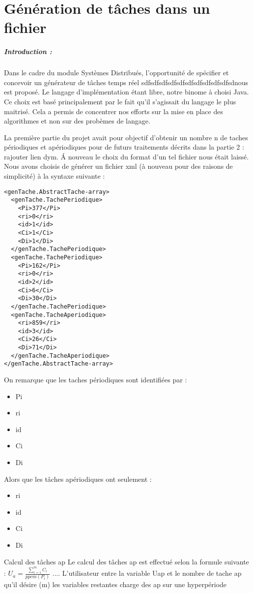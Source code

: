 \chapter{Génération de tâches dans un fichier}
\paragraph{Introduction :}
Dans le cadre du module Systèmes Distribués, l'opportunité de  spécifier et concevoir  un générateur de tâches temps réel sdfsdfsdfsdfsdfsdfsdfsdfsdfsdfsdnous est proposé. Le langage d'implémentation étant libre, notre binome à choisi Java. Ce choix est basé principalement par le fait qu'il s'agissait du langage le plus maitrisé. Cela a permis de concentrer nos efforts sur la mise en place des algorithmes et non sur des probèmes de langage.

La première partie du projet avait pour objectif d'obtenir un nombre n de taches périodiques et apériodiques pour de futurs traitements décrits dans la partie 2 : rajouter lien dym. \'A nouveau le choix du format d'un tel fichier nous était laissé. Nous avons choisis de générer un fichier xml (à nouveau pour des raisons  de simplicité) à la syntaxe suivante : 

\begin{lstlisting}
<genTache.AbstractTache-array>
  <genTache.TachePeriodique>
    <Pi>377</Pi>
    <ri>0</ri>
    <id>1</id>
    <Ci>1</Ci>
    <Di>1</Di>
  </genTache.TachePeriodique>
  <genTache.TachePeriodique>
    <Pi>162</Pi>
    <ri>0</ri>
    <id>2</id>
    <Ci>6</Ci>
    <Di>30</Di>
  </genTache.TachePeriodique>
  <genTache.TacheAperiodique>
    <ri>859</ri>
    <id>3</id>
    <Ci>26</Ci>
    <Di>71</Di>
  </genTache.TacheAperiodique>
</genTache.AbstractTache-array>
\end{lstlisting}
On remarque que les taches périodiques sont identifiées par : 
\begin{itemize}
\item
Pi 
\item
ri 
\item
id 
\item
Ci
\item
Di  
\end{itemize} 
Alors que les tâches apériodiques ont seulement : 
\begin{itemize}
\item
ri 
\item
id 
\item
Ci
\item
Di 
\end{itemize} 

Calcul des tâches ap  
Le calcul des tâches ap est effectué selon la formule suivante : $ U_a =  \frac{\sum_{i=1}^m C_i}{ppcm(P_i)}$   ....  L'utilisateur entre la variable Uap  et le nombre de tache ap qu'il désire (m) les variables restantes 
charge des ap sur une hyperpériode 
